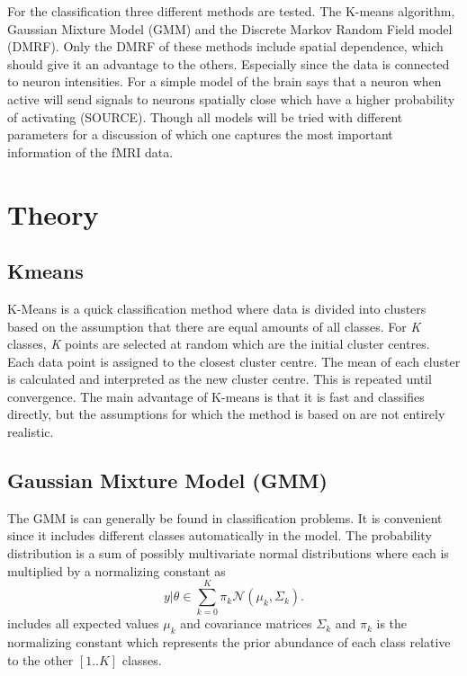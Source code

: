 \documentclass[a4paper,english]{article}
\begin{document}
For the classification three different methods are tested.
The K-means algorithm, Gaussian Mixture Model (GMM) and the Discrete Markov Random Field model (DMRF).
Only the DMRF of these methods include spatial dependence, which should give it an advantage to the others.
Especially since the data is connected to neuron intensities.
For a simple model of the brain says that a neuron when active will send signals to neurons spatially close which have a higher probability of activating (SOURCE).
Though all models will be tried with different parameters for a discussion of which one captures the most important information of the fMRI data.

\section{Theory}

\subsection{Kmeans}

K-Means is a quick classification method where data is divided into clusters based on the assumption that there are equal amounts of all classes. For \textit{K} classes, \textit{K} points are selected at random which are the initial cluster centres. Each data point is assigned to the closest cluster centre. The mean of each cluster is calculated and interpreted as the new cluster centre. This is repeated until convergence. The main advantage of K-means is that it is fast and classifies directly, but the assumptions for which the method is based on are not entirely realistic.


\subsection{Gaussian Mixture Model (GMM)}
The GMM is can generally be found in classification problems.
It is convenient since it includes different classes automatically in the model.
The probability distribution is a sum of possibly multivariate normal distributions where each is multiplied by a normalizing constant as
\begin{equation}
  y | \theta \in \sum_{k = 0}^K \pi_k \mathcal{N}(\mu_k, \Sigma_k).
  \label{eq:gmm}
\end{equation}
\theta includes all expected values $\mu_k$ and covariance matrices $\Sigma_k$ and $\pi_k$ is the normalizing constant which represents the prior abundance of each class relative to the other $[1..K]$ classes.
\end{document}
